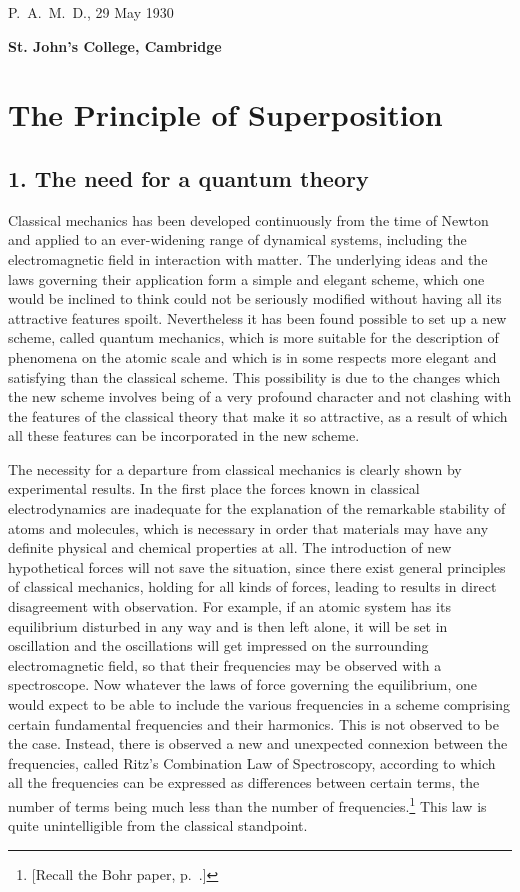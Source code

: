 \noindent P.\ A.\ M.\ D., 29 May 1930 \vspace{3mm}

\noindent\textbf{St. John's College, Cambridge}

\newpage

\section*{The Principle of Superposition}

\subsection{1. The need for a quantum theory}

Classical mechanics has been developed continuously from the time of Newton and applied to an ever-widening range of dynamical systems, including the electromagnetic field in interaction with matter.  The underlying ideas and the laws governing their application form a simple and elegant scheme, which one would be inclined to think could not be seriously modified without having all its attractive features spoilt.  Nevertheless it has been found possible to set up a new scheme, called quantum mechanics, which is more suitable for the description of phenomena on the atomic scale and which is in some respects more elegant and satisfying than the classical scheme.  This possibility is due to the changes which the new scheme involves being of a very profound character and not clashing with the features of the classical theory that make it so attractive, as a result of which all these features can be incorporated in the new scheme.

The necessity for a departure from classical mechanics is clearly shown by experimental results.  In the first place the forces known in classical electrodynamics are inadequate for the explanation of the remarkable stability of atoms and molecules, which is necessary in order that materials may have any definite physical and chemical properties at all.  The introduction of new hypothetical forces will not save the situation, since there exist general principles of classical mechanics, holding for all kinds of forces, leading to results in direct disagreement with observation.  For example, if an atomic system has its equilibrium disturbed in any way and is then left alone, it will be set in oscillation and the oscillations will get impressed on the surrounding electromagnetic field, so that their frequencies may be observed with a spectroscope.  Now whatever the laws of force governing the equilibrium, one would expect to be able to include the various frequencies in a scheme comprising certain fundamental frequencies and their harmonics.  This is not observed to be the case.  Instead, there is observed a new and unexpected connexion between the frequencies, called Ritz's Combination Law of Spectroscopy, according to which all the frequencies can be expressed as differences between certain terms, the number of terms being much less than the number of frequencies.\footnote{{[}Recall the Bohr paper, p.~\pageref{s:bohr_ritz}.{]}}  This law is quite unintelligible from the classical standpoint.

